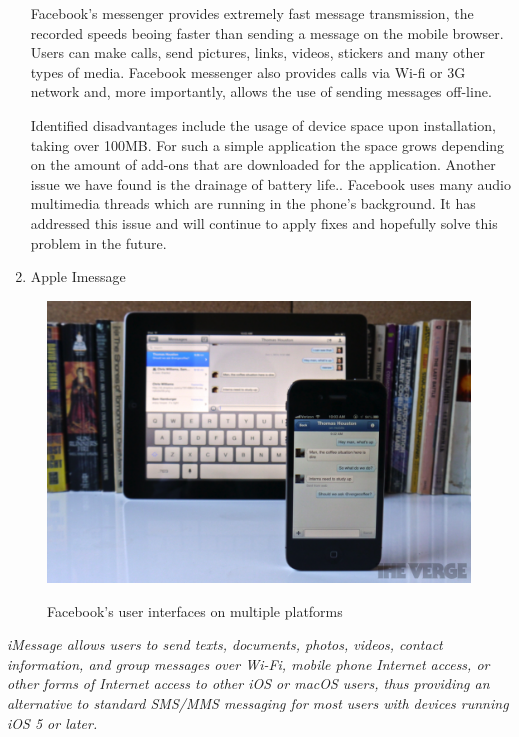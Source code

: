 \documentclass{article}
\begin{document}
\begin{enumerate}
	\newpage
	Facebook's messenger provides extremely fast message transmission, the recorded speeds beoing faster than sending a message on the mobile browser. Users can make calls, send pictures, links, videos, stickers and many other types of media. Facebook messenger also provides calls via Wi-fi or 3G network and, more importantly, allows the use of sending messages off-line.  \par
	
	Identified disadvantages include the usage of device space upon installation, taking over 100MB. For such a simple application the space grows depending on the amount of add-ons that are downloaded for the application. Another issue we have found is the drainage of battery life.\cite{facebookbattery}. Facebook uses many audio multimedia threads which are running in the phone's background. It has addressed this issue and will continue to apply fixes and hopefully solve this problem in the future. \par
	
	\item Apple Imessage
	\end{enumerate}
	
		\begin{figure}[h]
		\centering
		\includegraphics[scale=0.3]{facebook_messenger.png}
		\cite{imessagephoto}
		\caption{Facebook's user interfaces on multiple platforms}
	\end{figure}

	\textit{iMessage allows users to send texts, documents, photos, videos, contact information, and group messages over Wi-Fi, mobile phone Internet access, or other forms of Internet access to other iOS or macOS users, thus providing an alternative to standard SMS/MMS messaging for most users with devices running iOS 5 or later.}\\
\end{document}
